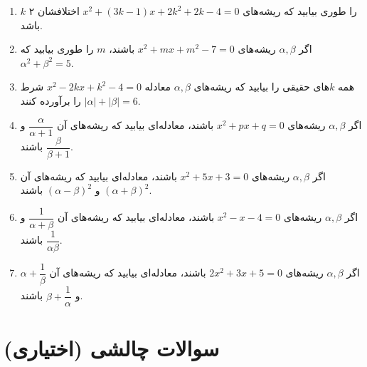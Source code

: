 \documentclass[12pt,a4paper]{article}
\begin{document}
\begin{enumerate}
\item $k$ را طوری بیابید که ریشه‌های $x^2 + (3k-1)x + 2k^2 + 2k - 4 = 0$ اختلافشان ۲ باشد.
\item اگر $\alpha, \beta$ ریشه‌های $x^2 + mx + m^2 - 7 = 0$ باشند، $m$ را طوری بیابید که $\alpha^2 + \beta^2 = 5$.
\item همه $k$‌های حقیقی را بیابید که ریشه‌های $\alpha, \beta$ معادله $x^2 - 2kx + k^2 - 4 = 0$ شرط $|\alpha| + |\beta| = 6$ را برآورده کنند.
\item اگر $\alpha, \beta$ ریشه‌های $x^2 + px + q = 0$ باشند، معادله‌ای بیابید که ریشه‌های آن $\dfrac{\alpha}{\alpha+1}$ و $\dfrac{\beta}{\beta+1}$ باشند.
\item اگر $\alpha, \beta$ ریشه‌های $x^2 + 5x + 3 = 0$ باشند، معادله‌ای بیابید که ریشه‌های آن $(\alpha+\beta)^2$ و $(\alpha-\beta)^2$ باشند.
\item اگر $\alpha, \beta$ ریشه‌های $x^2 - x - 4 = 0$ باشند، معادله‌ای بیابید که ریشه‌های آن $\dfrac{1}{\alpha+\beta}$ و $\dfrac{1}{\alpha\beta}$ باشند.
\item اگر $\alpha, \beta$ ریشه‌های $2x^2 + 3x + 5 = 0$ باشند، معادله‌ای بیابید که ریشه‌های آن $\alpha + \dfrac{1}{\beta}$ و $\beta + \dfrac{1}{\alpha}$ باشند.
\end{enumerate}

\vspace{1.5em}

\section*{سوالات چالشی (اختیاری)}
\end{document}
